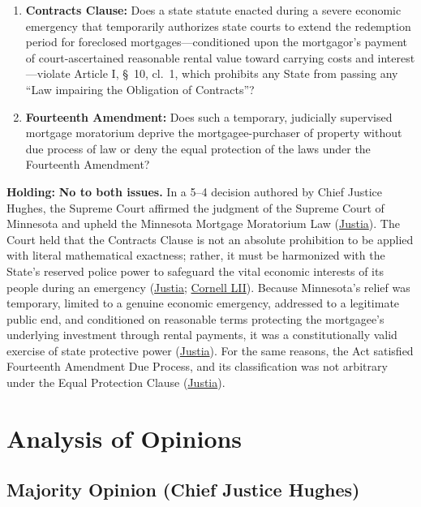 \documentclass[12pt]{article}
\begin{document}
\begin{enumerate}
  \item \textbf{Contracts Clause:} Does a state statute enacted during a severe economic emergency that temporarily authorizes state courts to extend the redemption period for foreclosed mortgages---conditioned upon the mortgagor's payment of court-ascertained reasonable rental value toward carrying costs and interest---violate Article I, \S\ 10, cl.\ 1, which prohibits any State from passing any ``Law impairing the Obligation of Contracts''?
  \item \textbf{Fourteenth Amendment:} Does such a temporary, judicially supervised mortgage moratorium deprive the mortgagee-purchaser of property without due process of law or deny the equal protection of the laws under the Fourteenth Amendment?
\end{enumerate}

\textbf{Holding:} \textbf{No to both issues.} In a 5--4 decision authored by Chief Justice Hughes, the Supreme Court affirmed the judgment of the Supreme Court of Minnesota and upheld the Minnesota Mortgage Moratorium Law (\href{https://supreme.justia.com/cases/federal/us/290/398/}{Justia}). The Court held that the Contracts Clause is not an absolute prohibition to be applied with literal mathematical exactness; rather, it must be harmonized with the State's reserved police power to safeguard the vital economic interests of its people during an emergency (\href{https://supreme.justia.com/cases/federal/us/290/398/}{Justia}; \href{https://www.law.cornell.edu/constitution-conan/article-1/section-10/clause-1/blaisdell-case-and-state-modifications-to-private-contracts}{Cornell LII}). Because Minnesota's relief was temporary, limited to a genuine economic emergency, addressed to a legitimate public end, and conditioned on reasonable terms protecting the mortgagee's underlying investment through rental payments, it was a constitutionally valid exercise of state protective power (\href{https://supreme.justia.com/cases/federal/us/290/398/}{Justia}). For the same reasons, the Act satisfied Fourteenth Amendment Due Process, and its classification was not arbitrary under the Equal Protection Clause (\href{https://supreme.justia.com/cases/federal/us/290/398/}{Justia}).

\section{Analysis of Opinions}
\subsection{Majority Opinion (Chief Justice Hughes)}
\end{document}
